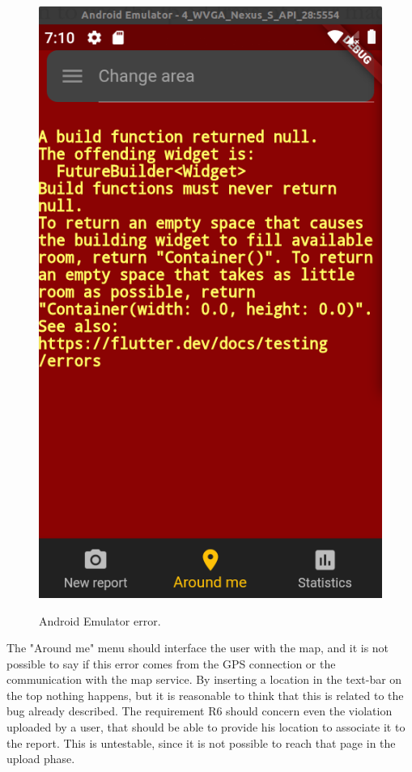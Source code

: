\documentclass[../ATD.tex]{subfiles}
\begin{document}
    \begin{figure}[H]
        \centering
        \includegraphics[scale = 0.4]{assets/futureError.png}\\
        \caption[Android Emulator error]{Android Emulator error.}
    \end{figure}

    The "Around me" menu should interface the user with the map, and it is not possible to say if this error comes from the GPS connection or the communication with the map service.
    By inserting a location in the text-bar on the top nothing happens, but it is reasonable to think that this is related to the bug already described.
    \newline
    The requirement R6 should concern even the violation uploaded by a user, that should be able to provide his location to associate it to the report.
    This is untestable, since it is not possible to reach that page in the upload phase.
\end{document}
